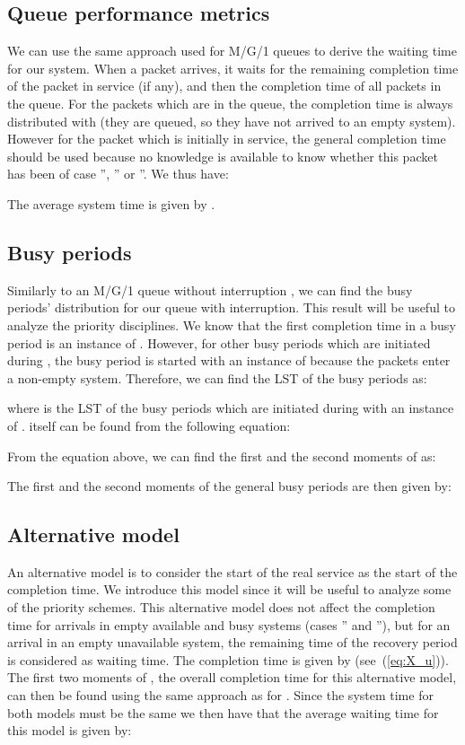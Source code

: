\documentclass[11pt,journal,oneside,onecolumn,draftclsnofoot]{IEEEtran}
\begin{document}
 


\subsection{Queue performance metrics}
We can use the same approach used for M/G/1 queues to derive the waiting time for our system. When a packet arrives, it waits for the remaining completion time of the packet in service (if any), and then the completion time of all packets in the queue. For the packets which are in the queue, the completion time is always distributed with  (they are queued, so they have not arrived to an empty system). However for the packet which is initially in service, the general completion time should be used because no knowledge is available to know whether this packet has been of case '', '' or ''. We thus have:

The average system time is given by 
.

\subsection{Busy periods}
\label{subsec:busy-periods}
Similarly to an M/G/1 queue without interruption \cite{takagi91}, we can find the busy periods' distribution for our queue with interruption. This result will be useful to analyze the priority disciplines. We know that the first completion time in a busy period is an instance of . However, for other busy periods which are initiated during , the busy period is started with an instance of  because the packets enter a non-empty system. Therefore, we can find the LST of the busy periods as:

where  is the LST of the busy periods which are initiated during  with an instance of .  itself can be found from the following equation:

From the equation above, we can find the first and the second moments of  
as:
  
The first and the second moments of the general busy periods are then given by:






\subsection{Alternative model}
\label{sec:alt_model}

An alternative model is to consider the start of the real service as the start of the completion time. We introduce this model since it will be useful to analyze some of the priority schemes. This alternative model does not affect the completion time for arrivals in empty available and busy systems (cases '' and ''), but for an arrival in an empty unavailable system, the remaining time of the recovery period  is considered as waiting time. The completion time is given by  (see~(\ref{eq:X_u})). The first two moments of , the overall completion time for this alternative model, can then be found using the same approach as for . Since the system time for both models must be the same we then have that the average waiting time for this model is given by:
\end{document}
